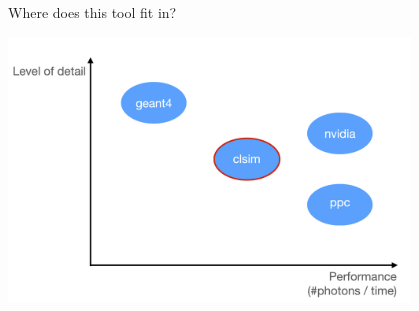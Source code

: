 
\begin{frame}[fragile]{Where does this tool fit in?}

  \includegraphics[width=0.8\textwidth]{img/clsim_ppc_geant4_nvidia}

\end{frame}